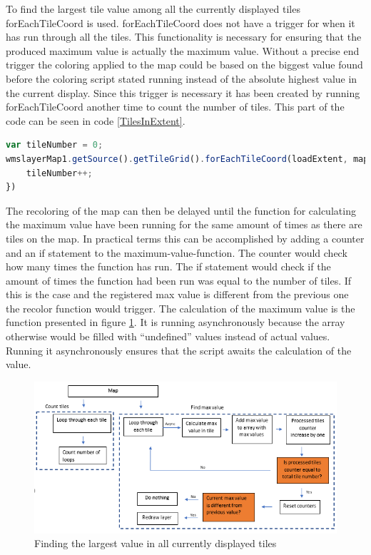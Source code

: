 To find the largest tile value among all the currently displayed tiles forEachTileCoord is used. forEachTileCoord does not have a trigger for when it has run through all the tiles. This functionality is necessary for ensuring that the produced maximum value is actually the maximum value. Without a precise end trigger the coloring applied to the map could be based on the biggest value found before the coloring script stated running instead of the absolute highest value in the current display.
Since this trigger is necessary it has been created by running forEachTileCoord another time to count the number of tiles. This part of the code can be seen in code \ref{TilesInExtent}.
\begin{lstlisting}[language=JavaScript, caption={Counting the amount of tiles within the current extent}, label= TilesInExtent,escapechar=|] 
var tileNumber = 0;
wmslayerMap1.getSource().getTileGrid().forEachTileCoord(loadExtent, mapZoom - zoomlevelAdjustment, function(tileCoord) {
	tileNumber++;
})
\end{lstlisting}
The recoloring of the map can then be delayed until the function for calculating the maximum value have been running for the same amount of times as there are tiles on the map. In practical terms this can be accomplished by adding a counter and an if statement to the maximum-value-function. The counter would check how many times the function has run. The if statement would check if the amount of times the function had been run was equal to the number of tiles. If this is the case and the registered max value is different from the previous one the recolor function would trigger.
The calculation of the maximum value is the function presented in figure \ref{DoubleLoop}. It is running asynchronously because the array otherwise would be filled with “undefined” values instead of actual values. Running it asynchronously ensures that the script awaits the calculation of the value.  
\begin{figure} [H]
	\centering
	\includegraphics[width=1\textwidth]{Pictures/DoubleLoop}
	\caption{Finding the largest value in all currently displayed tiles}
	\label{DoubleLoop}
\end{figure}

